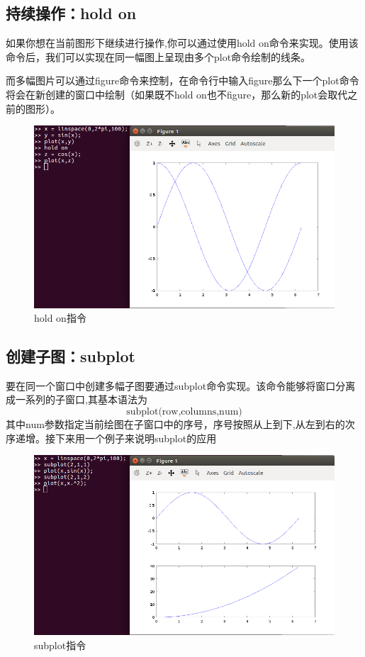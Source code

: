 \documentclass[a4paper,11pt]{ctexart}
\begin{document}
\subsection{持续操作：hold on}
如果你想在当前图形下继续进行操作,你可以通过使用hold on命令来实现。使用该命令后，我们可以实现在同一幅图上呈现由多个plot命令绘制的线条。\par
而多幅图片可以通过figure命令来控制，在命令行中输入figure那么下一个plot命令将会在新创建的窗口中绘制（如果既不hold on也不figure，那么新的plot会取代之前的图形）。
\begin{figure}[H]
	\begin{center}
		\includegraphics[width=.8\textwidth]{plot.png}
	\end{center}
	\caption{hold on指令}
\end{figure}
\subsection{创建子图：subplot}
要在同一个窗口中创建多幅子图要通过subplot命令实现。该命令能够将窗口分离成一系列的子窗口,其基本语法为
$$\text{subplot(row,columns,num)}$$
其中num参数指定当前绘图在子窗口中的序号，序号按照从上到下,从左到右的次序递增。接下来用一个例子来说明subplot的应用
\begin{figure}[H]
	\begin{center}
		\includegraphics[width=.8\textwidth]{subplot.png}
	\end{center}
	\caption{subplot指令}
\end{figure}
\end{document}
